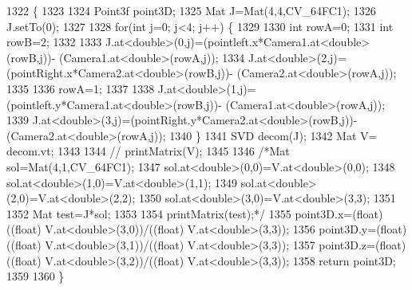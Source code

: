 \begin{DoxyCode}
1322                                                                                                      \{
1323 
1324     Point3f point3D;
1325     Mat J=Mat(4,4,CV\_64FC1);
1326     J.setTo(0);
1327 
1328     \textcolor{keywordflow}{for}(\textcolor{keywordtype}{int} j=0; j<4; j++) \{
1329 
1330         \textcolor{keywordtype}{int} rowA=0;
1331         \textcolor{keywordtype}{int} rowB=2;
1332 
1333         J.at<\textcolor{keywordtype}{double}>(0,j)=(pointleft.x*Camera1.at<\textcolor{keywordtype}{double}>(rowB,j))- (Camera1.at<\textcolor{keywordtype}{double}>(rowA,j));
1334         J.at<\textcolor{keywordtype}{double}>(2,j)=(pointRight.x*Camera2.at<\textcolor{keywordtype}{double}>(rowB,j))- (Camera2.at<\textcolor{keywordtype}{double}>(rowA,j));
1335 
1336         rowA=1;
1337 
1338         J.at<\textcolor{keywordtype}{double}>(1,j)=(pointleft.y*Camera1.at<\textcolor{keywordtype}{double}>(rowB,j))- (Camera1.at<\textcolor{keywordtype}{double}>(rowA,j));
1339         J.at<\textcolor{keywordtype}{double}>(3,j)=(pointRight.y*Camera2.at<\textcolor{keywordtype}{double}>(rowB,j))- (Camera2.at<\textcolor{keywordtype}{double}>(rowA,j));
1340     \}
1341     SVD decom(J);
1342     Mat V= decom.vt;
1343 
1344     \textcolor{comment}{// printMatrix(V);}
1345 
1346     \textcolor{comment}{/*Mat sol=Mat(4,1,CV\_64FC1);}
1347 \textcolor{comment}{        sol.at<double>(0,0)=V.at<double>(0,0);}
1348 \textcolor{comment}{        sol.at<double>(1,0)=V.at<double>(1,1);}
1349 \textcolor{comment}{        sol.at<double>(2,0)=V.at<double>(2,2);}
1350 \textcolor{comment}{        sol.at<double>(3,0)=V.at<double>(3,3);}
1351 \textcolor{comment}{}
1352 \textcolor{comment}{        Mat test=J*sol;}
1353 \textcolor{comment}{}
1354 \textcolor{comment}{        printMatrix(test);*/}
1355     point3D.x=(float) ((\textcolor{keywordtype}{float}) V.at<\textcolor{keywordtype}{double}>(3,0))/((float) V.at<\textcolor{keywordtype}{double}>(3,3));
1356     point3D.y=(float) ((\textcolor{keywordtype}{float}) V.at<\textcolor{keywordtype}{double}>(3,1))/((float) V.at<\textcolor{keywordtype}{double}>(3,3));
1357     point3D.z=(float) ((\textcolor{keywordtype}{float}) V.at<\textcolor{keywordtype}{double}>(3,2))/((float) V.at<\textcolor{keywordtype}{double}>(3,3));
1358     \textcolor{keywordflow}{return} point3D;
1359 
1360 \}
\end{DoxyCode}
